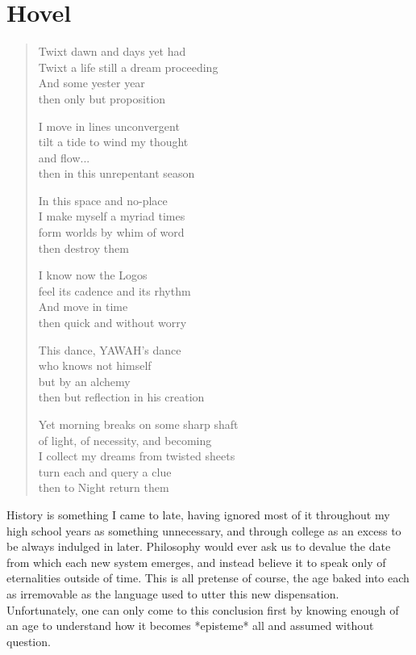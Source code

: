 \documentclass[ebook, 10pt, openright, onecolumn]{memoir}
\newenvironment{poetry}
{
  \begin{quote}
    \begin{itshape}
      \small
    }
    {
    \end{itshape}
  \end{quote}
}
\begin{document}
\chapter{Hovel}
\label{cha:hovel}

\begin{poetry}
  Twixt dawn and days yet had\\
  Twixt a life still a dream proceeding\\
  And some yester year\\
  then only but proposition

  I move in lines unconvergent\\
  tilt a tide to wind my thought\\
  and flow...\\
  then in this unrepentant season

  In this space and no-place\\
  I make myself a myriad times\\
  form worlds by whim of word\\
  then destroy them

  I know now the Logos\\
  feel its cadence and its rhythm\\
  And move in time\\
  then quick and without worry

  This dance, YAWAH's dance\\
  who knows not himself\\
  but by an alchemy\\
  then but reflection in his creation

  Yet morning breaks on some sharp shaft\\
  of light, of necessity, and becoming\\
  I collect my dreams from twisted sheets\\
  turn each and query a clue\\
  then to Night return them
\end{poetry}


History is something I came to late, having ignored most of it throughout my
high school years as something unnecessary, and through college as an excess to
be always indulged in later.  Philosophy would ever ask us to devalue the date
from which each new system emerges, and instead believe it to speak only of
eternalities outside of time.  This is all pretense of course, the age baked
into each as irremovable as the language used to utter this new dispensation.
Unfortunately, one can only come to this conclusion first by knowing enough of
an age to understand how it becomes *episteme* all and assumed without
question.
\end{document}
